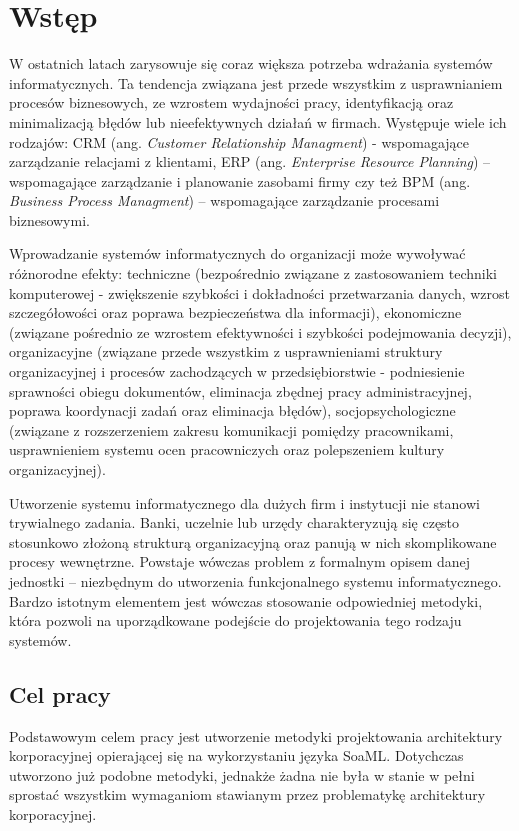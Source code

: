\chapter{Wstęp}
W ostatnich latach zarysowuje się coraz większa potrzeba wdrażania systemów informatycznych. Ta tendencja związana  jest przede wszystkim z usprawnianiem procesów biznesowych, ze wzrostem wydajności pracy, identyfikacją oraz minimalizacją błędów lub nieefektywnych działań w firmach. Występuje wiele ich rodzajów: CRM (ang. \emph{Customer Relationship Managment}) - wspomagające zarządzanie relacjami z klientami, ERP (ang. \emph{Enterprise Resource Planning}) – wspomagające zarządzanie i planowanie zasobami firmy czy też BPM (ang. \emph{Business Process Managment}) – wspomagające zarządzanie procesami biznesowymi. 

Wprowadzanie systemów informatycznych do organizacji może wywoływać różnorodne efekty: techniczne (bezpośrednio związane z zastosowaniem techniki komputerowej - zwiększenie szybkości i dokładności przetwarzania danych, wzrost szczegółowości oraz poprawa bezpieczeństwa dla informacji), ekonomiczne (związane pośrednio ze wzrostem efektywności i szybkości podejmowania decyzji), organizacyjne (związane przede wszystkim z usprawnieniami struktury organizacyjnej i procesów zachodzących w przedsiębiorstwie - podniesienie sprawności obiegu dokumentów, eliminacja zbędnej pracy administracyjnej, poprawa koordynacji zadań oraz eliminacja błędów), socjopsychologiczne (związane z rozszerzeniem zakresu komunikacji pomiędzy pracownikami, usprawnieniem systemu ocen pracowniczych oraz polepszeniem kultury organizacyjnej). \cite{EfektyZasSys}

Utworzenie systemu informatycznego dla dużych firm i instytucji nie stanowi trywialnego zadania. Banki, uczelnie lub urzędy charakteryzują się często stosunkowo złożoną strukturą organizacyjną oraz panują w nich skomplikowane procesy wewnętrzne. Powstaje wówczas problem z formalnym opisem danej jednostki – niezbędnym do utworzenia funkcjonalnego systemu informatycznego. Bardzo istotnym elementem jest wówczas stosowanie odpowiedniej metodyki, która pozwoli na uporządkowane podejście do projektowania tego rodzaju systemów. 

\section{Cel pracy}
Podstawowym celem pracy jest utworzenie metodyki projektowania architektury korporacyjnej opierającej się na wykorzystaniu języka SoaML. Dotychczas utworzono już podobne metodyki, jednakże żadna nie była w stanie w pełni sprostać wszystkim wymaganiom stawianym przez problematykę architektury korporacyjnej.

